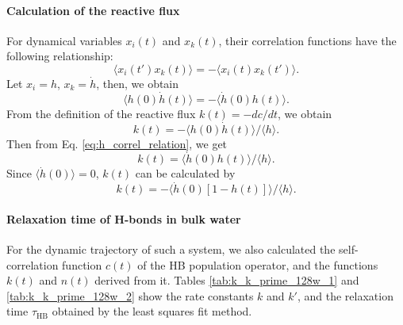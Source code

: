{\paragraph{Calculation of the reactive flux}\label{calc_rf}
For dynamical variables $x_i(t)$ and $x_k(t)$, their correlation functions have the following relationship\cite{Landau1980}:
\begin{equation}
\langle x_i(t') x_k(t)\rangle = -\langle x_i(t) x_k(t')\rangle.
\label{eq:correlation_relation}
\end{equation}
Let $x_i = h$, $x_k = \dot h$,
then, we obtain
\begin{equation}
\langle h(0) \dot{h}(t)\rangle=-\langle\dot{h}(0) h(t)\rangle. 
\label{eq:h_correl_relation}
\end{equation}
From the definition of the reactive flux $k(t) = -dc/dt$, we obtain 
\begin{equation}
k(t)=-\langle h(0) \dot{h}(t)\rangle /\langle h\rangle. 
\label{eq:rf1}
\end{equation}
Then from Eq. \ref{eq:h_correl_relation},
we get 
\begin{equation}
k(t) =  \langle \dot{h}(0)h(t)\rangle /\langle h\rangle. \nonumber
\label{eq:rf2}
\end{equation}
Since $\langle\dot{h}(0)\rangle=0$, $k(t)$ can be calculated by
\begin{equation}
k(t) = - \langle \dot{h}(0)[1-h(t)]\rangle /\langle h\rangle.
\label{eq:rf3}
\end{equation}


\paragraph{Relaxation time of H-bonds in bulk water}\label{rate_const_and_tau_R_128w}
% 
For the dynamic trajectory of such a system, we also calculated the self-correlation function $c(t)$ of the HB population operator, 
and the functions $k(t)$ and $n(t)$ derived from it. 
Tables \ref{tab:k_k_prime_128w_1} and \ref{tab:k_k_prime_128w_2} show the rate constants $k$ and $k'$, and 
the relaxation time $\tau_\text{HB}$ obtained by the least squares fit method. 

}
